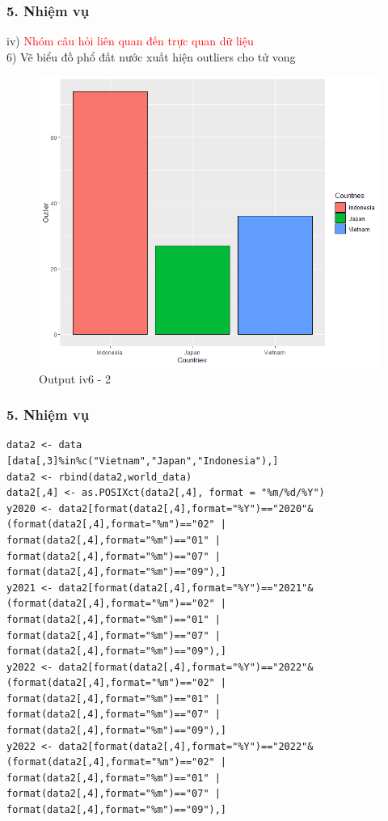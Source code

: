 \documentclass[english,10pt,table]{beamer}
\begin{document}
\begin{frame}[fragile]
\frametitle{5.  Nhiệm vụ}
	iv) \textcolor{red}{Nhóm câu hỏi liên quan đến trực quan dữ liệu}\\%
    6) Vẽ biểu đồ phổ đất nước xuất hiện outliers cho tử vong
	\begin{figure}[h!]
	\begin{center}
		    \includegraphics[scale = 0.4]{Images/IV/iv (6) - 2.png}
		     \caption{Output iv6 - 2}
		\end{center}
		\end{figure}
\end{frame}

\begin{frame}[fragile]
\frametitle{5.  Nhiệm vụ}
\lstset{
    title=Function and data for v vi vii viii}
\begin{lstlisting}[frame = single,basicstyle=\tiny]
data2 <- data
[data[,3]%in%c("Vietnam","Japan","Indonesia"),]
data2 <- rbind(data2,world_data)
data2[,4] <- as.POSIXct(data2[,4], format = "%m/%d/%Y")
y2020 <- data2[format(data2[,4],format="%Y")=="2020"& 
(format(data2[,4],format="%m")=="02" | 
format(data2[,4],format="%m")=="01" | 
format(data2[,4],format="%m")=="07" | 
format(data2[,4],format="%m")=="09"),]
y2021 <- data2[format(data2[,4],format="%Y")=="2021"& 
(format(data2[,4],format="%m")=="02" | 
format(data2[,4],format="%m")=="01" | 
format(data2[,4],format="%m")=="07" | 
format(data2[,4],format="%m")=="09"),]
y2022 <- data2[format(data2[,4],format="%Y")=="2022"& 
(format(data2[,4],format="%m")=="02" | 
format(data2[,4],format="%m")=="01" | 
format(data2[,4],format="%m")=="07" | 
format(data2[,4],format="%m")=="09"),]
y2022 <- data2[format(data2[,4],format="%Y")=="2022"& 
(format(data2[,4],format="%m")=="02" | 
format(data2[,4],format="%m")=="01" | 
format(data2[,4],format="%m")=="07" | 
format(data2[,4],format="%m")=="09"),]
\end{lstlisting}
\end{frame}
\end{document}
